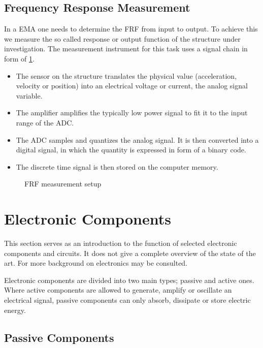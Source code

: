 \subsection{Frequency Response Measurement}

In a \ac{EMA} one needs to determine the \ac{FRF} from input to output. To achieve this we measure the so called response or output function of the structure under investigation. The measurement instrument for this task uses a signal chain in form of \ref{fig:measurement}.
\begin{itemize}
    \item The sensor on the structure translates the physical value (acceleration, velocity or position) into an electrical voltage or current, the analog signal variable.
    \item The amplifier amplifies the typically low power signal to fit it to the input range of the \ac{ADC}.
    \item The \ac{ADC} samples and quantizes the analog signal. It is then converted into a digital signal, in which the quantity is expressed in form of a binary code.
    \item The discrete time signal is then stored on the computer memory.
\end{itemize}
\cite{fu2001modal}

\begin{figure}[!htb]
    \centering
    
    \caption[Frequency Response Measurement]{\ac{FRF} measurement setup}
    \label{fig:measurement}
\end{figure}

\section{Electronic Components}

This section serves as an introduction to the function of selected electronic components and circuits. It does not give a complete overview of the state of the art. For more background on electronics \cite{Stiny2019AeB} may be consulted.

Electronic components are divided into two main types; passive and active ones. Where active components are allowed to generate, amplify or oscillate an electrical signal, passive components can only absorb, dissipate or store electric energy.

\subsection{Passive Components}

